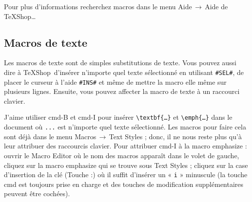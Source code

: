 \documentclass[11pt,french]{article}
\newcommand{\TS}{\textsf{\TeX Shop}}
\newcommand{\cmd}[1]{\textsf{#1}}
\newcommand{\mnu}[1]{\textsf{#1}}
\newcommand{\To}{\,\(\to\)\,}
\begin{document}
Pour plus d'informations recherchez \cmd{macros} dans le menu \mnu{Aide}\To\mnu{Aide de TeXShop…}


\subsection{Macros de texte}

Les macros de texte sont de simples substitutions de texte. Vous pouvez aussi dire à \TS\ d'insérer n'importe quel texte sélectionné en utilisant \verb|#SEL#|, de placer le curseur à l'aide \verb|#INS#| et même de mettre la macro elle même sur plusieurs lignes. Ensuite, vous pouvez affecter la macro de texte à un raccourci clavier.

J'aime utiliser \cmd{cmd-B} et \cmd{cmd-I} pour insérer \verb|\textbf{…}| et \verb|\emph{…}| dans le document où \texttt {...} est n'importe quel texte sélectionné. Les macros pour faire cela sont déjà dans le menu \mnu{Macros}\To\mnu{Text Styles} ; donc, il ne nous reste plus qu'à leur attribuer des raccourcis clavier. Pour attribuer \cmd{cmd-I} à la macro \mnu{emphasize} : ouvrir le \mnu{Macro Editor} où le nom des macros apparaît dans le volet de gauche, cliquez sur la macro \mnu{emphasize} qui se trouve sous \mnu{Text Styles} ; cliquez sur la case d'insertion de la clé (\mnu{Touche :}) où il suffit d'insérer un « \texttt{i} » minuscule (la touche \cmd{cmd} est toujours prise en charge et des touches de modification supplémentaires peuvent être cochées).

%
\end{document}
